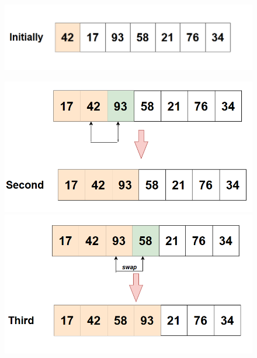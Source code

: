 \begin{figure}[H]
    \centering
    \includegraphics[width=1\linewidth]{img/Insertion sort/anh_1.png}
    
    \vspace{0.5cm}
    \includegraphics[width=1\linewidth]{img/Insertion sort/2.png}
    \vspace{0.5cm}
    \includegraphics[width=1\linewidth]{img/Insertion sort/3.png}
    \vspace{0.5cm}
   
    \label{fig:part1}
\end{figure}

